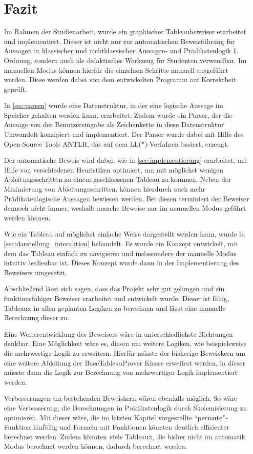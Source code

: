 
\chapter{Fazit}
Im Rahmen der Studienarbeit, wurde ein graphischer Tableaubeweiser erarbeitet und implementiert. Dieser ist nicht nur zur automatischen Beweisführung für Aussagen in klassischer und nichtklassischer Aussagen- und Prädikatenlogik 1. Ordnung, sondern auch als didaktisches Werkzeug für Studenten verwendbar. Im manuellen Modus können hierfür die einzelnen Schritte manuell ausgeführt werden. Diese werden dabei von dem entwickelten Programm auf Korrektheit geprüft.

In \autoref{sec:parsen} wurde eine Datenstruktur, in der eine logische Aussage im Speicher gehalten werden kann, erarbeitet. Zudem wurde ein Parser, der die Aussage von der Benutzereingabe als Zeichenkette in diese Datenstruktur Umwandelt konzipiert und implementiert. Der Parser wurde dabei mit Hilfe des Open-Source Tools ANTLR, das auf dem LL(*)-Verfahren basiert, erzeugt.

Der automatische Beweis wird dabei, wie in \autoref{sec:implementierung} erarbeitet, mit Hilfe von verschiedenen Heuristiken optimiert, um mit möglichst wenigen Ableitungsschritten zu einem geschlossenen Tableau zu kommen. Neben der Minimierung von Ableitungsschritten, können hierdurch auch mehr Prädikatenlogische Aussagen bewiesen werden. Bei diesen terminiert der Beweiser dennoch nicht immer, weshalb manche Beweise nur im manuellen Modus geführt werden können.

Wie ein Tableau auf möglichst einfache Weise dargestellt werden kann, wurde in \autoref{sec:darstellung_interaktion} behandelt. Es wurde ein Konzept entwickelt, mit dem das Tableau einfach zu navigieren und insbesondere der manuelle Modus intuitiv bedienbar ist. Dieses Konzept wurde dann in der Implementierung des Beweisers umgesetzt.

Abschließend lässt sich sagen, dass das Projekt sehr gut gelungen und ein funktionsfähiger Beweiser erarbeitet und entwickelt wurde. Dieser ist fähig, Tableaux in allen geplanten Logiken zu berechnen und lässt eine manuelle Berechnung dieser zu. 

Eine Weiterentwicklung des Beweisers wäre in unterschiedlichste Richtungen denkbar.
Eine Möglichkeit wäre es, diesen um weitere Logiken, wie beispielsweise die mehrwertige Logik zu erweitern. Hierfür müsste der bisherige Beweiskern um eine weitere Ableitung der BaseTableauProver Klasse erweitert werden, in dieser müsste dann die Logik zur Berechnung von mehrwertiger Logik implementiert werden.

Verbesserungen am bestehenden Beweiskern wären ebenfalls möglich. So wäre eine Verbesserung, die Berechnungen in Prädikatenlogik durch Skolemisierung zu optimieren. Mit dieser wäre, die im letzten Kapitel vorgestellte ``permute''-Funktion hinfällig und Formeln mit Funktionen könnten deutlich effizienter berechnet werden. Zudem könnten viele Tableaux, die bisher nicht im automatik Modus berechnet werden können, dadurch berechnet werden.




